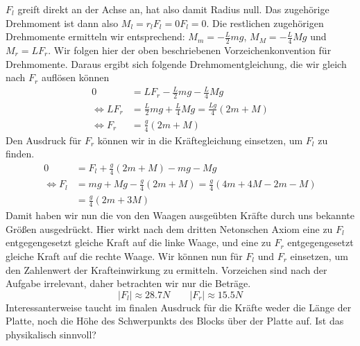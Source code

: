\documentclass[11pt]{article}
\begin{document}
$F_l$ greift direkt an der Achse an, hat also damit Radius null. Das zugehörige Drehmoment ist dann also $M_l = r_lF_l = 0F_l = 0$. Die restlichen zugehörigen Drehmomente ermitteln wir entsprechend: $M_m = -\frac{L}{2}mg$, $M_M = -\frac{L}{4}Mg$ und $M_r = LF_r$. Wir folgen hier der oben beschriebenen Vorzeichenkonvention für Drehmomente. Daraus ergibt sich folgende Drehmomentgleichung, die wir gleich nach $F_r$ auflösen können 
\begin{align}
        0 &= LF_r - \frac{L}{2}mg - \frac{L}{4}Mg \nonumber \\
        \iff LF_r &= \frac{L}{2}mg + \frac{L}{4}Mg = \frac{Lg}{4}(2m + M) \nonumber \\ 
        \iff F_r &= \frac{g}{4}(2m + M)
\end{align}
Den Ausdruck für $F_r$ können wir in die Kräftegleichung einsetzen, um $F_l$ zu finden. 
\begin{align}
        0 &= F_l + \frac{g}{4}(2m + M) - mg - Mg \nonumber \\
        \iff F_l &= mg + Mg - \frac{g}{4}(2m + M) = \frac{g}{4}(4m + 4M - 2m - M) \nonumber \\ 
        &= \frac{g}{4}(2m + 3M) 
\end{align}
Damit haben wir nun die von den Waagen ausgeübten Kräfte durch uns bekannte Größen ausgedrückt. Hier wirkt nach dem dritten Netonschen Axiom eine zu $F_l$ entgegengesetzt gleiche Kraft auf die linke Waage, und eine zu $F_r$ entgegengesetzt gleiche Kraft auf die rechte Waage. Wir können nun für $F_l$ und $F_r$ einsetzen, um den Zahlenwert der Krafteinwirkung zu ermitteln. Vorzeichen sind nach der Aufgabe irrelevant, daher betrachten wir nur die Beträge. 
\begin{equation*}
        |F_l| \approx 28.7N \quad\quad |F_r| \approx 15.5N
\end{equation*}
Interessanterweise taucht im finalen Ausdruck für die Kräfte weder die Länge der Platte, noch die Höhe des Schwerpunkts des Blocks über der Platte auf. Ist das physikalisch sinnvoll? 
\end{document}
